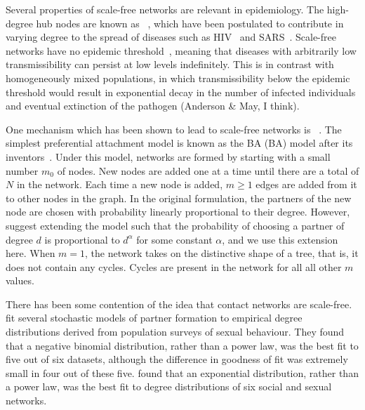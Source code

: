 Several properties of scale-free networks are relevant in epidemiology.  The
high-degree hub nodes are known as
~\autocite{kemper1980identification}, which have been
postulated to contribute in varying degree to the spread of diseases such as
\gls{HIV}~\autocite{stadler2013uncovering} and
\gls{SARS}~\autocite{shen2004superspreading}. Scale-free networks have no
epidemic threshold~\autocite{pastor2001epidemic}, meaning that diseases with
arbitrarily low transmissibility can persist at low levels indefinitely. This
is in contrast with homogeneously mixed populations, in which transmissibility
below the epidemic threshold would result in exponential decay in the number of
infected individuals and eventual extinction of the pathogen (Anderson \& May,
I think). 

One mechanism which has been shown to lead to scale-free networks is
~\autocite{simon1955class,
barabasi1999emergence}. The simplest preferential attachment model is known as
the \acrlong{BA} (BA) model after its
inventors~\autocite{barabasi1999emergence}. Under this model, networks are
formed by starting with a small number $m_0$ of nodes. New nodes are added one
at a time until there are a total of $N$ in the network. Each time a new node
is added, $m \geq 1$ edges are added from it to other nodes in the graph. In
the original formulation, the partners of the new node are chosen with
probability linearly proportional to their degree. However,
\citeauthor{barabasi1999emergence} suggest extending the model such that the
probability of choosing a partner of degree $d$ is proportional to $d^\alpha$
for some constant $\alpha$, and we use this extension here. When $m = 1$, the
network takes on the distinctive shape of a tree, that is, it does not contain
any cycles. Cycles are present in the network for all all other $m$ values.

There has been some contention of the idea that contact networks are
scale-free. \textcite{handcock2004likelihood} fit several stochastic models of
partner formation to empirical degree distributions derived from population
surveys of sexual behaviour. They found that a negative binomial distribution,
rather than a power law, was the best fit to five out of six datasets, although
the difference in goodness of fit was extremely small in four out of these
five. \textcite{bansal2007individual} found that an exponential distribution,
rather than a power law, was the best fit to degree distributions of six social
and sexual networks. 

